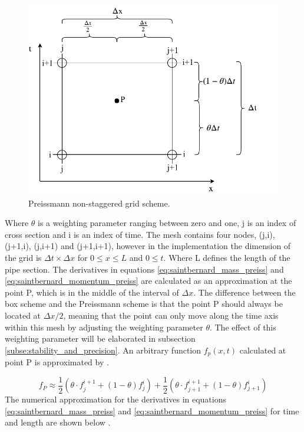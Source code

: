 \begin{figure}[H]
\centering
%
\includegraphics[width=.7\textwidth]{report/simulation/pictures/preissmann_scheme.pdf}
\caption{Preissmann non-staggered grid scheme.}
\label{fig:preissmann_grid_scheme}
\end{figure}

Where $\theta$ is a weighting parameter ranging between zero and one, j is an index of cross section and i is an index of time. The mesh contains four nodes, (j,i), (j+1,i), (j,i+1) and (j+1,i+1), however in the implementation the dimension of the grid is $\Delta t \times \Delta x$ for $0 \leq x \leq L$ and $0\leq t$. Where L defines the length of the pipe section. The derivatives in equations \ref{eq:saintbernard_mass_preiss} and \ref{eq:saintbernard_momentum_preiss} are calculated as an approximation at the point P, which is in the middle of the interval of $\Delta x$.%
 The difference between the box scheme and the Preissmann scheme is that the point P should always be located at $\Delta x/2$, meaning that the point can only move along the time axis within this mesh by adjusting the weighting parameter $\theta$. The effect of this weighting parameter will be elaborated in subsection \ref{subse:stability_and_precision}.
 An arbitrary function $f_p(x,t)$ calculated at point P is approximated by \cite{numerical_modeling}.

\begin{equation}\label{eq:approximated_function}
    f_P \approx \frac{1}{2} (\theta \cdot f_j^{i+1}+(1-\theta)f_j^i)+\frac{1}{2}(\theta\cdot f_{j+1}^{i+1}+(1-\theta)f_{j+1}^i)
\end{equation}
The numerical approximation for the derivatives in equations \ref{eq:saintbernard_mass_preiss} and \ref{eq:saintbernard_momentum_preiss} for time and length are shown below \cite{numerical_modeling}.

